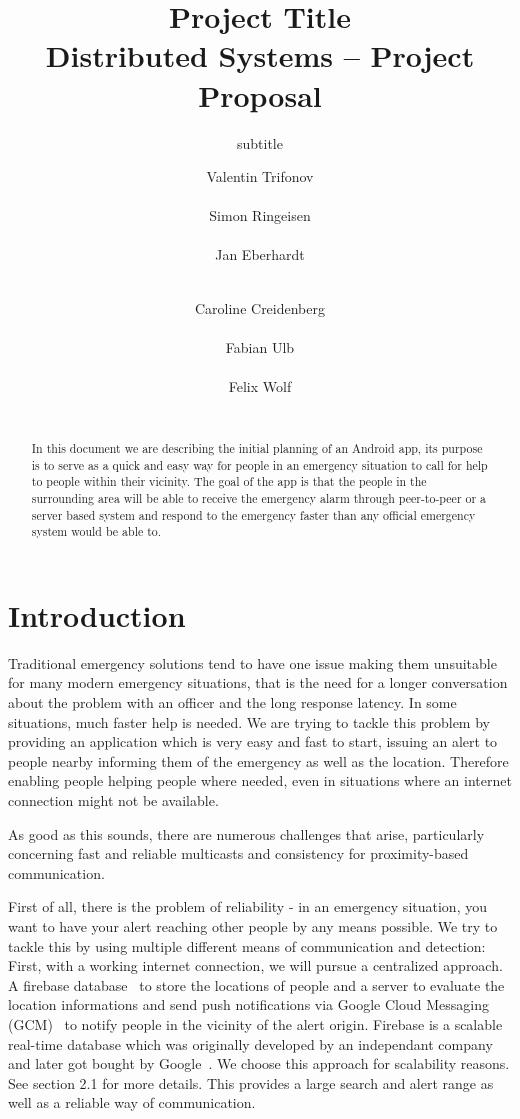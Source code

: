 \documentclass{report}
\title{Project Title\\
\normalsize{Distributed Systems -- Project Proposal}}
\subtitle{subtitle}
\author{
%
%
\alignauthor \normalsize{Valentin Trifonov}\\
	\affaddr{\normalsize{ETH ID 13-941-679}}\\
	\email{\normalsize{vatrifon@student.ethz.ch}}
\alignauthor \normalsize{Simon Ringeisen}\\
	\affaddr{\normalsize{ETH ID 13-934-930}}\\
	\email{\normalsize{rsimon@student.ethz.ch}}
\alignauthor \normalsize{Jan Eberhardt}\\
	\affaddr{\normalsize{ETH ID 13-925-417}}\\
	\email{\normalsize{ebjan@student.ethz.ch}}
\and
\alignauthor \normalsize{Caroline Creidenberg}\\
	\affaddr{\normalsize{ETH 15-907-421}}\\
	\email{\normalsize{ccreiden@student.ethz.ch}}
\alignauthor \normalsize{Fabian Ulb}\\
	\affaddr{\normalsize{ETH ID 13-931-951}}\\
	\email{\normalsize{fabianu@student.ethz.ch}}
\alignauthor \normalsize{Felix Wolf}\\
	\affaddr{\normalsize{ETH ID 13-927-983}}\\
	\email{\normalsize{fewolf@student.ethz.ch}}
}
\begin{document}
\maketitle

\begin{abstract}
In this document we are describing the initial planning of an Android app, its purpose is to serve as a quick and easy way for people in an emergency situation to call for help to people within their vicinity. The goal of the app is that the people in the surrounding area will be able to receive the emergency alarm through peer-to-peer or a server based system and respond to the emergency faster than any official emergency system would be able to. 
\end{abstract}

\section{Introduction}

Traditional emergency solutions tend to have one issue making them unsuitable for many modern emergency situations, that is the need for a longer conversation about the problem with an officer and the long response latency. In some situations, much faster help is needed.
We are trying to tackle this problem by providing an application which is very easy and fast to start, issuing an alert to people nearby informing them of the emergency as well as the location. Therefore enabling people helping people where needed, even in situations where an internet connection might not be available.

As good as this sounds, there are numerous challenges that arise, particularly concerning fast and reliable multicasts and consistency for proximity-based communication.

First of all, there is the problem of reliability - in an emergency situation, you want to have your alert reaching other people by any means possible. We try to tackle this by using multiple different means of communication and detection:
First, with a working internet connection, we will pursue a centralized approach. A firebase database~\cite{firebase} to store the locations of people and a server to evaluate the location informations and send push notifications via Google Cloud Messaging (GCM)~\cite{google_cloud_messaging} to notify people in the vicinity of the alert origin. Firebase is a scalable real-time database which was originally developed by an independant company and later got bought by Google~\cite{firebase}. We choose this approach for scalability reasons. See section 2.1 for more details. This provides a large search and alert range as well as a reliable way of communication.
\end{document}
